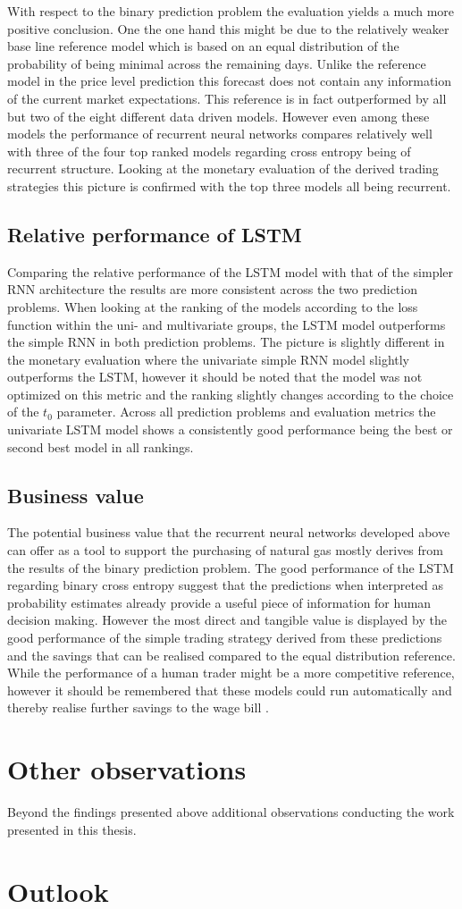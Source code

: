 With respect to the binary prediction problem the evaluation yields a much more positive conclusion. One the one hand this might be due to the relatively weaker base line reference model which is based on an equal distribution of the probability of being minimal across the remaining days. Unlike the reference model in the price level prediction this forecast does not contain any information of the current market expectations. This reference is in fact outperformed by all but two of the eight different data driven models. However even among these models the performance of recurrent neural networks compares relatively well with three of the four top ranked models regarding cross entropy being of recurrent structure. 
Looking at the monetary evaluation of the derived trading strategies this picture is confirmed with the top three models all being recurrent.
\subsection{Relative performance of LSTM}
Comparing the relative performance of the LSTM model with that of the simpler RNN architecture the results are more consistent across the two prediction problems. When looking at the ranking of the models according to the loss function within the uni- and multivariate groups, the LSTM model outperforms the simple RNN in both prediction problems. The picture is slightly different in the monetary evaluation where the univariate simple RNN model slightly outperforms the LSTM, however it should be noted that the model was not optimized on this metric and the ranking slightly changes according to the choice of the $t_0$ parameter. Across all prediction problems and evaluation metrics the univariate LSTM model shows a consistently good performance being the best or second best model in all rankings. 
\subsection{Business value}
The potential business value that the recurrent neural networks developed above can offer as a tool to support the purchasing of natural gas mostly derives from the results of the binary prediction problem. The good performance of the LSTM regarding binary cross entropy suggest that the predictions when interpreted as probability estimates already provide a useful piece of information for human decision making. However the most direct and tangible value is displayed by the good performance of the simple trading strategy derived from these predictions and the savings that can be realised compared to the equal distribution reference. While the performance of a human trader might be a more competitive reference, however it should be remembered that these models could run automatically and thereby realise further savings to the wage bill .
\section{Other observations}
Beyond the findings presented above additional observations conducting the work presented in this thesis.
\section{Outlook}
